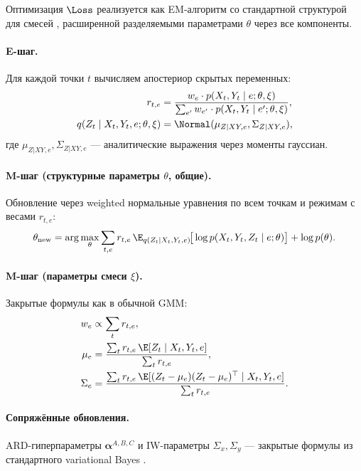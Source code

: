 \documentclass[a4paper,14pt]{article}
\theoremstyle{plain} %
\theoremstyle{definition} %
\theoremstyle{remark} %
\begin{document}
Оптимизация $\Loss$ реализуется как EM-алгоритм со стандартной структурой для смесей \cite{mclachlan2000finite, dempster1977em}, расширенной разделяемыми параметрами $\theta$ через все компоненты.

\paragraph{E-шаг.} Для каждой точки $t$ вычисляем апостериор скрытых переменных:
\begin{align}
    r_{t,e} &= \frac{w_e \cdot p(X_t, Y_t \mid e; \theta, \xi)}{\sum_{e'} w_{e'} \cdot p(X_t, Y_t \mid e'; \theta, \xi)}, \\
    q(Z_t \mid X_t, Y_t, e; \theta, \xi) &= \Normal(\mu_{Z|XY,e}, \Sigma_{Z|XY,e}),
\end{align}
где $\mu_{Z|XY,e}, \Sigma_{Z|XY,e}$ --- аналитические выражения через моменты гауссиан.

\paragraph{M-шаг (структурные параметры $\theta$, общие).} Обновление через weighted нормальные уравнения по всем точкам и режимам с весами $r_{t,e}$:
\begin{equation}
    \theta_{\mathrm{new}} = \arg\max_\theta \sum_{t,e} r_{t,e}\, \E_{q(Z_t|X_t,Y_t,e)}\!\big[\log p(X_t, Y_t, Z_t \mid e; \theta)\big] + \log p(\theta).
\end{equation}

\paragraph{M-шаг (параметры смеси $\xi$).} Закрытые формулы как в обычной GMM:
\begin{align}
    w_e &\propto \sum_t r_{t,e}, \\
    \mu_e &= \frac{\sum_t r_{t,e}\, \E[Z_t \mid X_t, Y_t, e]}{\sum_t r_{t,e}}, \\
    \Sigma_e &= \frac{\sum_t r_{t,e}\, \E[(Z_t - \mu_e)(Z_t - \mu_e)^\top \mid X_t, Y_t, e]}{\sum_t r_{t,e}}.
\end{align}

\paragraph{Сопряжённые обновления.} ARD-гиперпараметры $\bm{\alpha}^{A,B,C}$ и IW-параметры $\Sigma_x, \Sigma_y$ --- закрытые формулы из стандартного variational Bayes \cite{beal2003variational}.
\end{document}
